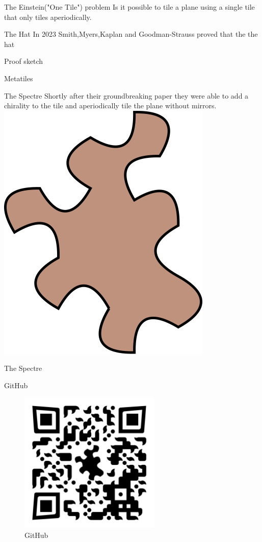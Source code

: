 \documentclass{beamer}
\begin{document}
\begin{frame}{The Einstein("One Tile") problem}
    Is it possible to tile a plane using a single tile that only tiles aperiodically.
\end{frame}

\begin{frame}{The Hat}
    In 2023 Smith,Myers,Kaplan and Goodman-Strauss proved that the the hat
\end{frame}

\begin{frame}{Proof sketch}
    
\end{frame}

\begin{frame}{Metatiles}
    
\end{frame}

\begin{frame}{The Spectre}
    Shortly after their groundbreaking paper they were able to add a chirality to the tile and aperiodically tile the plane without mirrors.
    \includegraphics[width=0.3\linewidth]{images/Spectre_aperiodic_monotile_single.svg.png}
\end{frame}

\begin{frame}{The Spectre}
    
\end{frame}

\begin{frame}{GitHub}
    \begin{figure}
        \centering
        \includegraphics[width=0.6\textwidth]{images/qr-codes/tilling-presentation-github.png}
        \caption{GitHub}
        \label{fig:github-qrcode}
    \end{figure}
\end{frame}
\end{document}
